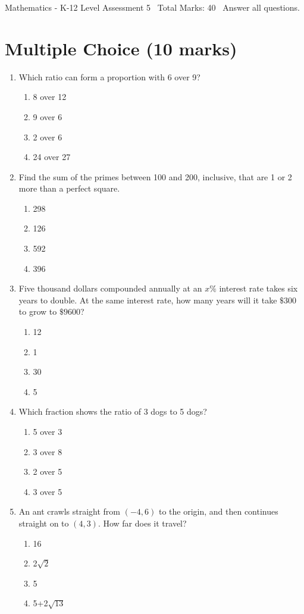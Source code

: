 \documentclass[12pt]{article}
\begin{document}
\begin{center}
Mathematics - K-12 Level Assessment 5 \
Total Marks: 40 \
Answer all questions.
\end{center}

\section*{Multiple Choice (10 marks)}
\begin{enumerate}[label=\arabic*.]
\item Which ratio can form a proportion with 6 over 9?
\begin{enumerate}[label=(\alph*)]
    \item 8 over 12
    \item 9 over 6
    \item 2 over 6
    \item 24 over 27
\end{enumerate}
\item Find the sum of the primes between 100 and 200, inclusive, that are 1 or 2 more than a perfect square.
\begin{enumerate}[label=(\alph*)]
    \item 298
    \item 126
    \item 592
    \item 396
\end{enumerate}
\item Five thousand dollars compounded annually at an $x\%$ interest rate takes six years to double. At the same interest rate, how many years will it take $\$300$ to grow to $\$9600$?
\begin{enumerate}[label=(\alph*)]
    \item 12
    \item 1
    \item 30
    \item 5
\end{enumerate}
\item Which fraction shows the ratio of 3 dogs to 5 dogs?
\begin{enumerate}[label=(\alph*)]
    \item 5 over 3
    \item 3 over 8
    \item 2 over 5
    \item 3 over 5
\end{enumerate}
\item An ant crawls straight from $(-4,6)$ to the origin, and then continues straight on to $(4,3)$. How far does it travel?
\begin{enumerate}[label=(\alph*)]
    \item 16
    \item 2\ensuremath{\sqrt{2}}
    \item 5
    \item 5+2\ensuremath{\sqrt{13}}
\end{enumerate}
\end{enumerate}
\end{document}
